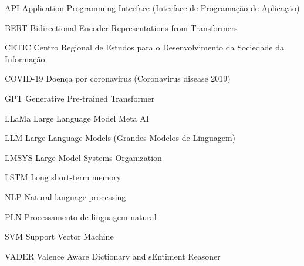 \documentclass[
	12pt,					%
	openright,				%
	oneside,					%
	a4paper,					%
	english,					%
	brazil					%
	]{abntex2}
\begin{document}
\frenchspacing

\pretextual



\imprimirfolhaderosto*















\listoffigures*
\cleardoublepage

\listoftables
\cleardoublepage

\begin{siglas}
	\item[API] Application Programming Interface (Interface de Programação de Aplicação)
	\item[BERT] Bidirectional Encoder Representations from Transformers
	\item[CETIC] Centro Regional de Estudos para o Desenvolvimento da Sociedade da Informação
	\item[COVID-19] Doença por coronavirus (Coronavirus disease 2019)
	\item[GPT] Generative Pre-trained Transformer
	\item[LLaMa] Large Language Model Meta AI
	\item[LLM] Large Language Models (Grandes Modelos de Linguagem)
	\item[LMSYS] Large Model Systems Organization
	\item[LSTM] Long short-term memory
	\item[NLP] Natural language processing
	\item[PLN] Processamento de linguagem natural
	\item[SVM] Support Vector Machine
	\item[VADER] Valence Aware Dictionary and sEntiment Reasoner
\end{siglas}
\end{document}
